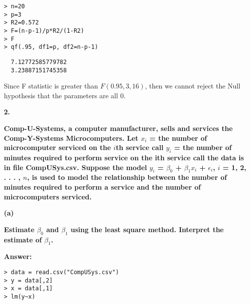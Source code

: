\documentclass[letterpaper,11pt]{article}
\begin{document}
\begin{lstlisting}
> n=20
> p=3
> R2=0.572
> F=(n-p-1)/p*R2/(1-R2)
> F
> qf(.95, df1=p, df2=n-p-1)
\end{lstlisting}

\begin{lstlisting}
  7.12772585779782
  3.23887151745358
\end{lstlisting}
Since F statistic is greater than $F(0.95,3,16)$, then we cannot reject the Null hypothesis that the parameters are all 0.


\begin{addmargin}[-2em]{0em} \large{\textbf{2. }}\end{addmargin}

\begin{addmargin}[-1.1em]{0em} \textbf{Comp-U-Systems, a computer manufacturer, sells and services the Comp-Y-Systems Microcomputers. Let
$x_i$ = the number of microcomputer serviced on the $i$th service call
$y_i$ = the number of minutes required to perform service on the ith service call
the data is in file CompUSys.csv. Suppose the model $y_i$ = $\beta_0$ + $\beta_1x_i$ + $\epsilon_i$, $i$ = 1, 2, . . . , $n$, is used to model the relationship between the number of minutes required to perform a service and the number of microcomputers serviced.
}\par\end{addmargin}

\bigbreak
\begin{addmargin}[-1.1em]{0em}
\textbf{(a)}\par\end{addmargin}
\textbf{Estimate $\beta_0$ and $\beta_1$ using the least square method. Interpret the estimate of $\beta_1$.}\par
\bigbreak
\begin{addmargin}[-0.5em]{0em}
\textbf{Answer: }\end{addmargin}

\begin{lstlisting}
> data = read.csv("CompUSys.csv")
> y = data[,2]
> x = data[,1]
> lm(y~x)
\end{lstlisting}
\end{document}
